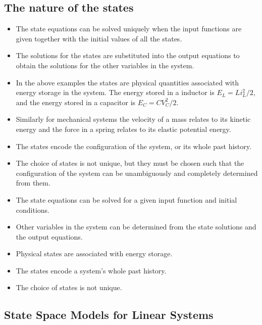 \subsection*{The nature of the states}

\begin{itemize}
	\item The state equations can be solved uniquely when the input functions are given together with the initial values of all the states.
	\item The solutions for the states are substituted into the output equations to obtain the solutions for the other variables in the system.
	\item In the above examples the states are physical quantities associated with energy storage in the system. The energy stored in a inductor is $E_L=Li_L^2/2$, and the energy stored in a capacitor is $E_C=CV_C^2/2$.
	\item Similarly for mechanical systems the velocity of a mass relates to its kinetic energy and the force in a spring relates to its elastic potential energy.
	\item The states encode the configuration of the system, or its whole past history.
	\item The choice of states is not unique, but they must be chosen such that the configuration of the system can be unambiguously and completely determined from them.
\end{itemize}
\ifslidesonly
\begin{slide}
	\begin{itemize}
	\item The state equations can be solved for a given input function and initial conditions.
	\item Other variables in the system can be determined from the state solutions and the output equations.
	\item Physical states are associated with energy storage.
	\item The states encode a system's whole past history.
	\item The choice of states is not unique.
\end{itemize}
\end{slide}
\fi

\subsection*{State Space Models for Linear Systems}

